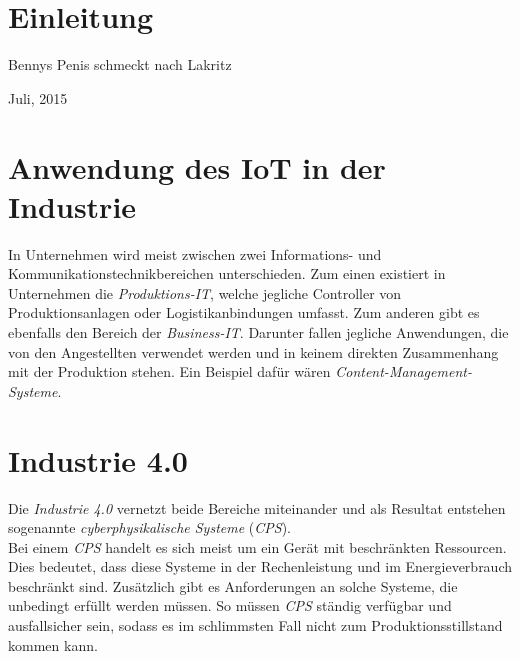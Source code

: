 \documentclass[conference]{IEEEtran}
\begin{document}
\begin{abstract}
\lipsum[1]
\end{abstract}





%
\IEEEpeerreviewmaketitle



\section{Einleitung}
Bennys Penis schmeckt nach Lakritz

 
\hfill Juli, 2015


\newpage

\section{Anwendung des IoT in der Industrie}

In Unternehmen wird meist zwischen zwei Informations- und Kommunikationstechnikbereichen unterschieden. Zum einen existiert in Unternehmen die \textit{Produktions-IT}, welche jegliche Controller von Produktionsanlagen oder Logistikanbindungen umfasst. Zum anderen gibt es ebenfalls den Bereich der \textit{Business-IT}. Darunter fallen jegliche Anwendungen, die von den Angestellten verwendet werden und in keinem direkten Zusammenhang mit der Produktion stehen. Ein Beispiel dafür wären \textit{Content-Management-Systeme}.\\

\section{Industrie 4.0}
Die \textit{Industrie 4.0} vernetzt beide Bereiche miteinander und als Resultat entstehen sogenannte \textit{cyberphysikalische Systeme} (\textit{CPS}).\\
Bei einem \textit{CPS} handelt es sich meist um ein Gerät mit beschränkten Ressourcen. Dies bedeutet, dass diese Systeme in der Rechenleistung und im Energieverbrauch beschränkt sind. Zusätzlich gibt es Anforderungen an solche Systeme, die unbedingt erfüllt werden müssen. So müssen \textit{CPS} ständig verfügbar und ausfallsicher sein, sodass es im schlimmsten Fall nicht zum Produktionsstillstand kommen kann.
\end{document}
